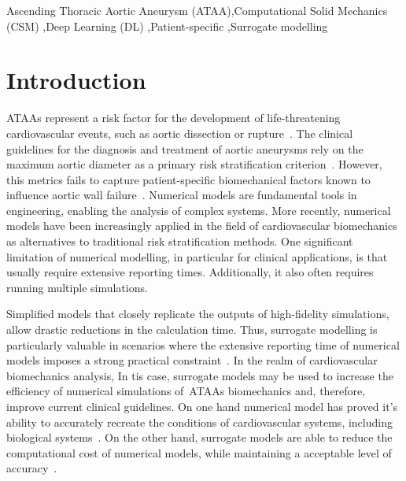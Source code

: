 \documentclass[a4paper,fleqn]{cas-sc}
\begin{document}
\begin{keywords}
Ascending Thoracic Aortic Aneurysm (ATAA)\sep Computational Solid Mechanics (CSM) \sep Deep Learning (DL) \sep Patient-specific \sep Surrogate modelling
\end{keywords}

\maketitle

\glsresetall
\section{Introduction}\label{sec:intro}
\glspl{ATAA} represent a risk factor for the development of life-threatening cardiovascular events, such as aortic dissection or rupture~\cite{GOUVEIAEMELO2022,KUZMIK2012565}. The clinical guidelines for the diagnosis and treatment of aortic aneurysms rely on the maximum aortic diameter as a primary risk stratification criterion~\cite{europeguidelines2014,american2010}. However, this metrics fails to capture patient-specific biomechanical factors known to influence aortic wall failure~\cite{MARTUFI2016390,Pape20071120}. Numerical models are fundamental tools in engineering, enabling the analysis of complex systems. More recently, numerical models have been increasingly applied in the field of cardiovascular biomechanics~\cite{Sazonov2017,long2017,Brunet2021,Moosavi2014} as alternatives to traditional risk stratification methods. One significant limitation of numerical modelling, in particular for clinical applications, is that usually require extensive reporting times. Additionally, it also often requires running multiple simulations.

Simplified models that closely replicate the outputs of high-fidelity simulations, allow drastic reductions in the calculation time. Thus, surrogate modelling is particularly valuable in scenarios where the extensive reporting time of numerical models imposes a strong practical constraint~\cite{alizadeh2020,mendez2018}. In the realm of cardiovascular biomechanics analysis, In tis case, surrogate models may be used to increase the efficiency of numerical simulations of~\glspl{ATAA} biomechanics and, therefore, improve current clinical guidelines. On one hand numerical model has proved it's ability to accurately recreate the conditions of cardiovascular systems, including biological systems~\cite{Mariotti2021,Bols2016,Yang2014,Lantz2011}. On the other hand, surrogate models are able to reduce the computational cost of numerical models, while maintaining a acceptable level of accuracy~\cite{alizadeh2020,donmazov2024}.
\end{document}
